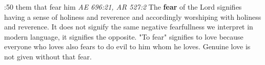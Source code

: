 :50 {them that fear him}
{\it AE 696:21, AR 527:2} The {\bf fear} of the Lord signifies having a sense of holiness and reverence and accordingly worshiping with holiness and reverence. It does not signify the same negative fearfullness we interpret in modern language, it signifies the opposite. "To fear" signifies to love because everyone who loves also fears to do evil to him whom he loves. Genuine love is not given without that fear.




















